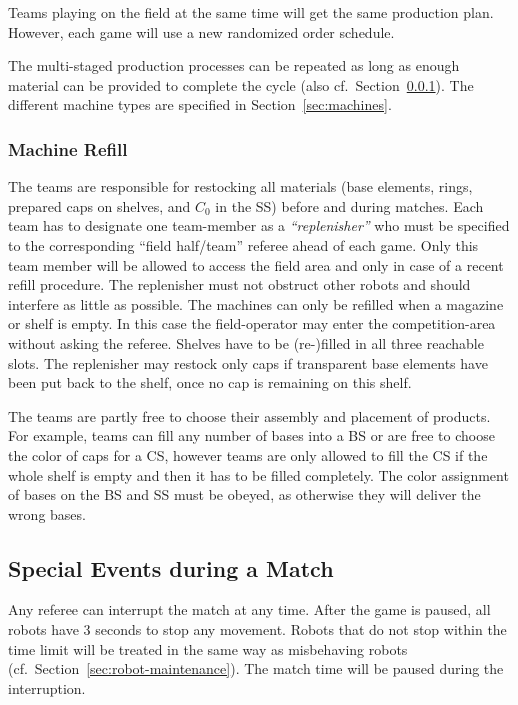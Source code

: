 \documentclass[12pt,twoside]{article}
\newcommand{\refsec}[1]{Section~\ref{#1}}
\begin{document}
Teams playing on the field at the same time will get the same
production plan. However, each game will use a new randomized order
schedule.

The multi-staged production processes can be repeated as long as
enough material can be provided to complete the cycle (also
cf.~\refsec{sec:machine-refill}). The different machine types are
specified in Section~\ref{sec:machines}.

\subsubsection{Machine Refill}
\label{sec:machine-refill}
The teams are responsible for restocking all materials (base elements,
rings, prepared caps on shelves, and $C_0$ in the SS) before and during matches.
Each team has to designate one team-member as a \textit{``replenisher''} who
must be specified to the corresponding ``field half/team'' referee ahead of each
game.  Only this team member will be allowed to access the field area and only
in case of a recent refill procedure.  The replenisher must not obstruct other
robots and should interfere as little as possible.  The machines can only be
refilled when a magazine or shelf is empty. In this case the field-operator may
enter the competition-area without asking the referee. Shelves have to be
(re-)filled in all three reachable slots. %
The replenisher may restock only caps if transparent base elements have been put
back to the shelf, once no cap is remaining on this shelf.

The teams are partly free to choose their assembly and placement of products.
For example, teams can fill any number of bases into a BS or are free to choose
the color of caps for a CS, however teams are only allowed to fill the CS if the
whole shelf is empty and then it has to be filled completely.  The color
assignment of bases on the BS and SS must be obeyed, as otherwise they will
deliver the wrong
bases.

\subsection{Special Events during a Match}
\label{sec:during-match}
Any referee can interrupt the match at any time. After the game is
paused, all robots have 3 seconds to stop any movement.  Robots that
do not stop within the time limit will be treated in the same way as
misbehaving robots (cf.~\refsec{sec:robot-maintenance}).  The match
time will be paused during the interruption.
\end{document}
